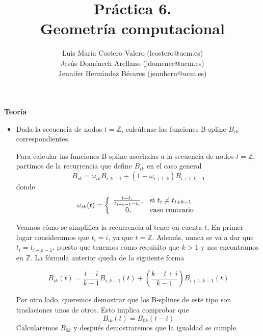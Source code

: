 \documentclass[12pt,a4paper]{article}
\title{Práctica 6. \\ Geometría computacional}
\author{Luis María Costero Valero (lcostero@ucm.es)\\ Jesús Doménech
  Arellano (jdomenec@ucm.es) \\ Jennifer Hernández Bécares (jennhern@ucm.es)}
\date{}
\begin{document}
\maketitle
\onehalfspace

\begin{center}
  {\textbf{Teoría}}
\end{center}
\begin{itemize}



  \item Dada la secuencia de nodos $t=\mathbb{Z}$, calcúlense las
  funciones B-spline $B_{ik}$ correspondientes.

  Para calcular las funciones B-spline asociadas a la secuencia de
  nodos $t=\mathbb{Z}$, partimos de la recurrencia que define $B_{ik}$
  en el caso general
  \begin{equation}
    B_{ik}=\omega_{ik}B_{i,k-1}+(1-\omega_{i+1,k})B_{i+1,k-1}
  \end{equation}
  donde
  \begin{equation}
    \omega_{ik}(t)=
    \left\lbrace
    \begin{array}{c l}
      \frac{t-t_i}{t_{i+k-1}-t_i}, & $si $t_i\neq t_{i+k-1}\\
      0, & $caso contrario $ \\
    \end{array}
    \right.
  \end{equation}

  Veamos cómo se simplifica la recurrencia al tener en cuenta $t$. En primer lugar
  consideramos que $t_i=i$, ya que $t=\mathbb{Z}$. Además, nunca se va
  a dar que $t_{i}=t_{i+k-1}$, puesto que tenemos como requisito que
  $k>1$ y nos encontramos en $\mathbb{Z}$. La fórmula anterior queda
  de la siguiente forma

  \begin{equation}
    B_{ik}(t)=\frac{t-i}{k-1}B_{i,k-1}(t)+(\frac{k-t+i}{k-1})B_{i+1,k-1}(t)
  \end{equation}

  Por otro lado, queremos demostrar que los B-splines de este tipo son
  traslaciones unos de otros. Esto implica comprobar que
  \begin{equation}
    \label{eq:1}
    B_{ik}(t)=B_{0k}(t-i)
  \end{equation}
  Calcularemos $B_{0k}$ y después
  demostraremos que la igualdad se cumple. \\


\end{itemize}
\end{document}
